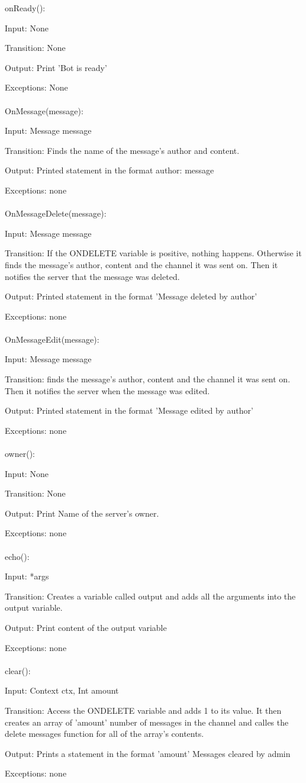 \documentclass[12,english]{article}
\begin{document}
		
		onReady():
		
		Input: None
		
		Transition: None
		
		Output: Print 'Bot is ready'
		
		Exceptions: None\\
		\\
		
		OnMessage(message):
		
		Input: Message message
		
		Transition: Finds the name of the message's author and content.
		
		Output: Printed statement in the format author: message
		
		Exceptions: none\\ 
		\\
		OnMessageDelete(message):
		
		Input: Message message
		
		Transition: If the ONDELETE variable is positive, nothing happens. Otherwise it finds the message's author, content and the channel it was sent on. Then it notifies the server that the message was deleted.
		
		Output: Printed statement in the format 'Message deleted by {author}'
		
		Exceptions: none\\ 
		\\ 
		OnMessageEdit(message):
		
		Input: Message message
		
		Transition: finds the message's author, content and the channel it was sent on. Then it notifies the server when the message was edited.
		
		Output: Printed statement in the format 'Message edited by {author}'
		
		Exceptions: none\\
		\\
		owner():
		
		Input: None
		
		Transition: None
		
		Output: Print Name of the server's owner.
		
		Exceptions: none\\
		\\
		echo():
		
		Input: *args
		
		Transition: Creates a variable called output and adds all the arguments into the output variable.
		
		Output: Print content of the output variable
		
		Exceptions: none\\ 
		\\
		clear():
		
		Input: Context ctx, Int amount
		
		Transition: Access the ONDELETE variable and adds 1 to its value. It then creates an array of 'amount' number of messages in the channel and calles the delete messages function for all of the array's contents.

		Output: Prints a statement in the format 'amount' Messages cleared by admin
		
		Exceptions: none\\
\end{document}
